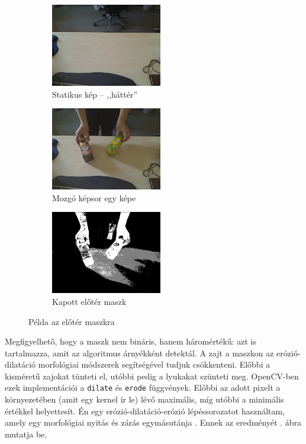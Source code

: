 \begin{figure}[tbh]
\centering
\begin{subfigure}[b]{.32\linewidth}
	\centering
	\includegraphics[width=137pt]{figures/image230.png}
	\caption{Statikus kép -- ,,háttér''}
  \end{subfigure}
\begin{subfigure}[b]{.32\linewidth}
	\centering
	\includegraphics[width=137pt]{figures/image343.png}
	\caption{Mozgó képsor egy képe}
  \end{subfigure}
\begin{subfigure}[b]{.32\linewidth}
	\centering
	\includegraphics[width=137pt]{figures/mask343.png}
	\caption{Kapott előtér maszk}
  \end{subfigure}
\caption{Példa az előtér maszkra \label{fig:my_mog2}}
\end{figure}

Megfigyelhető, hogy a maszk nem bináris, hanem háromértékű: azt is tartalmazza, amit az algoritmus árnyékként detektál. A zajt a maszkon az erózió-dilatáció morfológiai módszerek segítségével tudjuk csökkenteni. Előbbi a kisméretű zajokat tünteti el, utóbbi pedig a lyukakat szünteti meg. OpenCV-ben ezek implementációi a \texttt{dilate} és \texttt{erode} függvények. Előbbi az adott pixelt a környezetében (amit egy kernel ír le) lévő maximális, míg utóbbi a minimális értékkel helyettesít. Én egy erózió-dilatáció-erózió lépéssorozatot használtam, amely egy morfológiai nyitás és zárás egymásutánja \cite{kepfeldolg-modszerek}. Ennek az eredményét . ábra mutatja be.


